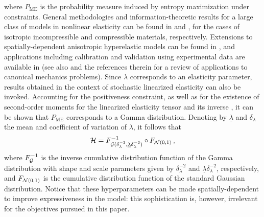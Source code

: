where $P_{\text{ME}}$ is the probability measure induced by entropy maximization under constraints. General methodologies and information-theoretic results for a large class of models in nonlinear elasticity can be found in \cite{staber2015cras} and \cite{Staber2017zamm}, for the cases of isotropic incompressible and compressible materials, respectively. Extensions to spatially-dependent anisotropic hyperelastic models can be found in \cite{STABER201894,CHEN2022114897}, and applications including calibration and validation using experimental data are available in \cite{STABER2017743,staber2019stochastic,CHEN2022114897} (see also \cite{mihai-book} and the references therein for a review of applications to canonical mechanics problems). Since $\lambda$ corresponds to an elasticity parameter, results obtained in the context of stochastic linearized elasticity can also be invoked. Accounting for the positiveness constraint, as well as for the existence of second-order moments for the linearized elasticity tensor and its inverse \cite{SOIZE200626,GuilleminotSoize2017}, it can be shown that $P_{\text{ME}}$ corresponds to a Gamma distribution. Denoting by $\underline{\lambda}$ and $\delta_{\lambda}$ the mean and coefficient of variation of $\lambda$, it follows that
\begin{equation}
    {\mathcal{H}} = F_{{\mathcal{G}}(\delta_{\lambda}^{-2},\underline{\lambda}\delta_{\lambda}^{-2})}^{-1} \circ F_{{\mathcal{N}}(0,1)}\,,
\end{equation}
where $F_{{\mathcal{G}}}^{-1}$ is the inverse cumulative distribution function of the Gamma distribution with shape and scale parameters given by $\delta_{\lambda}^{-2}$ and $\underline{\lambda}\delta_{\lambda}^{-2}$, respectively, and $F_{{\mathcal{N}}(0,1)}$ is the cumulative distribution function of the standard Gaussian distribution. Notice that these hyperparameters can be made spatially-dependent to improve expressiveness in the model: this sophistication is, however, irrelevant for the objectives pursued in this paper. 

